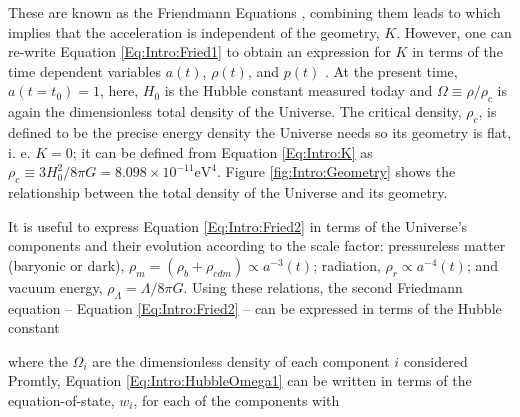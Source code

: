 \qquad These are known as the Friendmann Equations \citep{1922Friedmann}, combining them leads to
which implies that the acceleration is independent of the geometry, $K$. However, one can re-write Equation \eqref{Eq:Intro:Fried1} to obtain an expression for $K$ in terms of the time dependent variables $a(t)$, $\rho (t)$, and $p(t)$ \citep{padmanabhan_1999}. At the present time, $a(t=t_0) = 1$, 
here, $H_0$ is the Hubble constant measured today and $\Omega \equiv \rho/\rho_c$ is again the dimensionless total density of the Universe. The critical density, $\rho_c$, is defined to be the precise energy density the Universe needs so its geometry is flat, i. e. $K=0$; it can be defined from Equation \eqref{Eq:Intro:K} as $\rho_c \equiv 3H_0^2/8\pi G = 8.098 \times 10^{-11} \text{eV}^{4}$. Figure \ref{fig:Intro:Geometry} shows the relationship between the total density of the Universe and its geometry.

\qquad It is useful to express Equation \eqref{Eq:Intro:Fried2} in terms of the Universe's components and their evolution according to the scale factor: pressureless matter (baryonic or dark), $\rho_m = (\rho_{b} + \rho_{cdm}) \propto a^{-3}(t)$; radiation, $\rho_r \propto a^{-4}(t)$; and vacuum energy, $\rho_{\Lambda} = \Lambda/8\pi G$. Using these relations, the second Friedmann equation -- Equation \eqref{Eq:Intro:Fried2} -- can be expressed in terms of the Hubble constant

where the $\Omega_i$ are the dimensionless density of each component $i$ considered
Promtly, Equation \eqref{Eq:Intro:HubbleOmega1} can be written in terms of the equation-of-state, $w_i$, for each of the components
with

